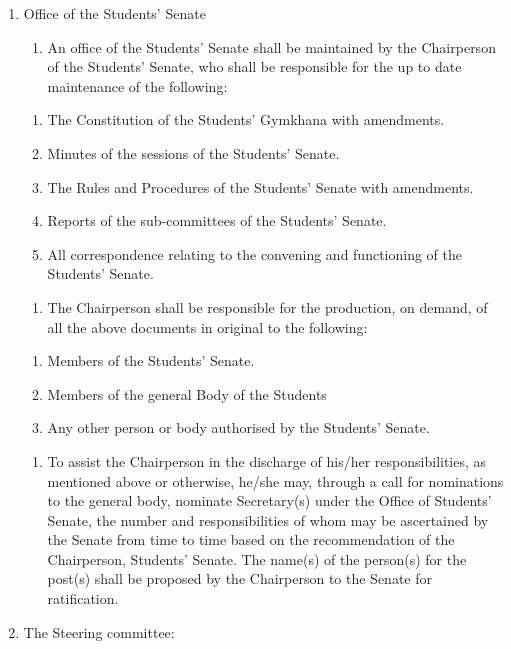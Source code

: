 \begin{enumerate}
\def\labelenumi{\arabic{enumi}.}
\item
  Office of the Students' Senate

  \begin{enumerate}
  \def\labelenumii{\alph{enumii}.}
  \itemsep1pt\parskip0pt
  \item
    An office of the Students' Senate shall be maintained by the
    Chairperson of the Students' Senate, who shall be responsible for
    the up to date maintenance of the following:
  \end{enumerate}

  \begin{enumerate}
  \def\labelenumii{\arabic{enumii}.}
  \item
    The Constitution of the Students' Gymkhana with amendments.
  \item
    Minutes of the sessions of the Students' Senate.
  \item
    The Rules and Procedures of the Students' Senate with amendments.
  \item
    Reports of the sub-committees of the Students' Senate.
  \item
    All correspondence relating to the convening and functioning of the
    Students' Senate.
  \end{enumerate}

  \begin{enumerate}
  \def\labelenumii{\alph{enumii}.}
  \setcounter{enumii}{1}
  \itemsep1pt\parskip0pt
  \item
    The Chairperson shall be responsible for the production, on demand,
    of all the above documents in original to the following:
  \end{enumerate}

  \begin{enumerate}
  \def\labelenumii{\arabic{enumii}.}
  \item
    Members of the Students' Senate.
  \item
    Members of the general Body of the Students
  \item
    Any other person or body authorised by the Students' Senate.
  \end{enumerate}

  \begin{enumerate}
  \def\labelenumii{\alph{enumii}.}
  \setcounter{enumii}{2}
  \itemsep1pt\parskip0pt
  \item
    To assist the Chairperson in the discharge of his/her
    responsibilities, as mentioned above or otherwise, he/she may,
    through a call for nominations to the general body, nominate
    Secretary(s) under the Office of Students' Senate, the number and
    responsibilities of whom may be ascertained by the Senate from time
    to time based on the recommendation of the Chairperson, Students'
    Senate. The name(s) of the person(s) for the post(s) shall be
    proposed by the Chairperson to the Senate for ratification.
  \end{enumerate}
\item
  The Steering committee:


\end{enumerate}
